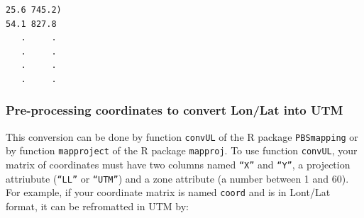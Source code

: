 \documentclass[a4paper,10pt]{article}
\begin{document}
\medskip
\begin{verbatim}
25.6 745.2)
54.1 827.8
   .     .
   .     .
   .     .
   .     .
\end{verbatim}










\subsubsection{Pre-processing coordinates to convert Lon/Lat into UTM} 

This conversion can be done by function {\tt convUL} of the R package {\tt PBSmapping} or by function {\tt mapproject}  
of the R package {\tt mapproj}.
To use function {\tt convUL}, your matrix of coordinates must have two columns named  {\tt ``X''} and  
{\tt ``Y''}, a projection attriubute ({\tt ``LL''} or {\tt ``UTM''}) and a zone attribute (a number between 1 and 60). 
For example, if your coordinate matrix is named {\tt coord} and is in Lont/Lat format, it can be refromatted in UTM by:
\end{document}
